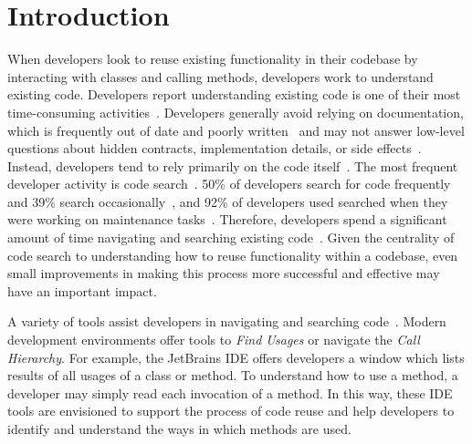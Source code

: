 \documentclass[conference]{IEEEtran}
\begin{document}
\section{Introduction}

When developers look to reuse existing functionality in their codebase by interacting with classes and calling methods, developers work to understand existing code. Developers report understanding existing code is one of their most time-consuming activities~\cite{latoza2006maintaining}. Developers generally avoid relying on documentation, which is frequently out of date and poorly written~\cite{documentation} and may not answer low-level questions about hidden contracts, implementation details, or side effects~\cite{head2018not}. Instead, developers tend to rely primarily on the code itself~\cite{head2018not, latoza2006maintaining}. The most frequent developer activity is code search~\cite{singer2010examination,brandt2009two,sadowski2015developers}. 50\% of developers search for code frequently and 39\% search occasionally~\cite{sim2011well}, and 92\% of developers used searched when they were working on maintenance tasks~\cite{lawrance2008using}. Therefore, developers spend a significant amount of time navigating and searching existing code~\cite{piorkowski2016foraging,ko2006exploratory}. Given the centrality of code search to understanding how to reuse functionality within a codebase, even small improvements in making this process more successful and effective may have an important impact. 



A variety of tools assist developers in navigating and searching code~\cite{augustine2015field,ko2006exploratory,albusays2017interviews}. Modern development environments offer tools to \textit{Find Usages} or navigate the \textit{Call Hierarchy}. For example, the JetBrains IDE offers developers a window which lists results of all usages of a class or method. To understand how to use a method, a developer may simply read each invocation of a method. In this way, these IDE tools are envisioned to support the process of code reuse and help developers to identify and understand the ways in which methods are used.


\end{document}
